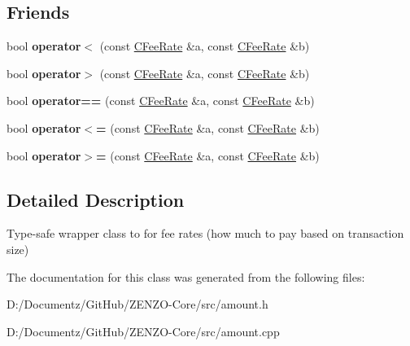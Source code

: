\subsection*{Friends}
\begin{DoxyCompactItemize}
\item 
\mbox{\label{class_c_fee_rate_ac6171d01f1032c0f08e804f2b19e84e8}} 
bool {\bfseries operator$<$} (const \mbox{\hyperlink{class_c_fee_rate}{C\+Fee\+Rate}} \&a, const \mbox{\hyperlink{class_c_fee_rate}{C\+Fee\+Rate}} \&b)
\item 
\mbox{\label{class_c_fee_rate_ab69eafe1cbb126cc0549bc5936422a2c}} 
bool {\bfseries operator$>$} (const \mbox{\hyperlink{class_c_fee_rate}{C\+Fee\+Rate}} \&a, const \mbox{\hyperlink{class_c_fee_rate}{C\+Fee\+Rate}} \&b)
\item 
\mbox{\label{class_c_fee_rate_a90b4daf7a7d840f47c453b9ba51744cf}} 
bool {\bfseries operator==} (const \mbox{\hyperlink{class_c_fee_rate}{C\+Fee\+Rate}} \&a, const \mbox{\hyperlink{class_c_fee_rate}{C\+Fee\+Rate}} \&b)
\item 
\mbox{\label{class_c_fee_rate_af580c9e0a2509b79a497cee50116bfcc}} 
bool {\bfseries operator$<$=} (const \mbox{\hyperlink{class_c_fee_rate}{C\+Fee\+Rate}} \&a, const \mbox{\hyperlink{class_c_fee_rate}{C\+Fee\+Rate}} \&b)
\item 
\mbox{\label{class_c_fee_rate_a3eebd7ed699091974194e47cfb2a571c}} 
bool {\bfseries operator$>$=} (const \mbox{\hyperlink{class_c_fee_rate}{C\+Fee\+Rate}} \&a, const \mbox{\hyperlink{class_c_fee_rate}{C\+Fee\+Rate}} \&b)
\end{DoxyCompactItemize}


\subsection{Detailed Description}
Type-\/safe wrapper class to for fee rates (how much to pay based on transaction size) 

The documentation for this class was generated from the following files\+:\begin{DoxyCompactItemize}
\item 
D\+:/\+Documentz/\+Git\+Hub/\+Z\+E\+N\+Z\+O-\/\+Core/src/amount.\+h\item 
D\+:/\+Documentz/\+Git\+Hub/\+Z\+E\+N\+Z\+O-\/\+Core/src/amount.\+cpp\end{DoxyCompactItemize}
